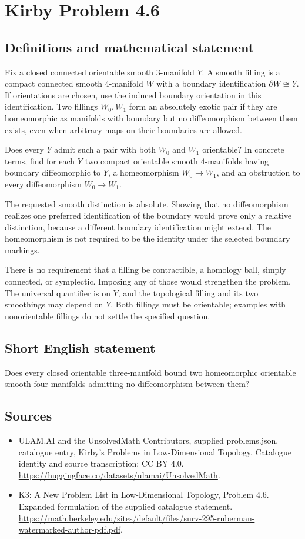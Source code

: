 \documentclass[11pt,a4paper]{article}
\begin{document}
\section*{Kirby Problem 4.6}\label{statement}

\subsection{Definitions and mathematical statement}
Fix a closed connected orientable smooth $3$-manifold $Y$.
A smooth filling is a compact connected smooth $4$-manifold $W$ with
a boundary identification $\partial W\cong Y$. If orientations are
chosen, use the induced boundary orientation in this identification.
Two fillings $W_0,W_1$ form an absolutely exotic pair if they are
homeomorphic as manifolds with boundary but no diffeomorphism between
them exists, even when arbitrary maps on their boundaries are allowed.

Does every $Y$ admit such a pair with both $W_0$ and $W_1$
orientable? In concrete terms, find for each $Y$ two compact orientable
smooth $4$-manifolds having boundary diffeomorphic to $Y$, a homeomorphism
$W_0\to W_1$, and an obstruction to every diffeomorphism
$W_0\to W_1$.

The requested smooth distinction is absolute. Showing that no
diffeomorphism realizes one preferred identification of the boundary
would prove only a relative distinction, because a different boundary
identification might extend. The homeomorphism is not required to be
the identity under the selected boundary markings.

There is no requirement that a filling be contractible, a homology
ball, simply connected, or symplectic. Imposing any of those would
strengthen the problem. The universal quantifier is on $Y$, and the
topological filling and its two smoothings may depend on $Y$.
Both fillings must be orientable; examples with nonorientable fillings
do not settle the specified question.
\subsection{Short English statement}
Does every closed orientable three-manifold bound two homeomorphic orientable smooth four-manifolds admitting no diffeomorphism between them?
\subsection{Sources}
\begin{itemize}
\item[S1] ULAM.AI and the UnsolvedMath Contributors, supplied problems.json, catalogue entry, Kirby's Problems in Low-Dimensional Topology. Catalogue identity and source transcription; CC BY 4.0.
\url{https://huggingface.co/datasets/ulamai/UnsolvedMath}.
\item[S2] K3: A New Problem List in Low-Dimensional Topology, Problem 4.6. Expanded formulation of the supplied catalogue statement.
\url{https://math.berkeley.edu/sites/default/files/surv-295-ruberman-watermarked-author-pdf.pdf}.
\end{itemize}
\end{document}
